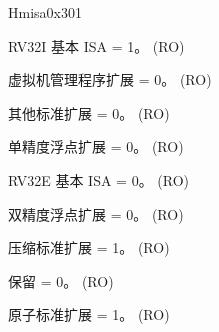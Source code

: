 \begin{register}{H}{misa}{0x301}
\begin{regdesc}
\begin{reglist}
\label{fielddesc:LPMISAI}\item [I] RV32I 基本 ISA = 1。 (RO)
\label{fielddesc:LPMISAH}\item [H] 虚拟机管理程序扩展 = 0。 (RO)
\label{fielddesc:LPMISAG}\item [G] 其他标准扩展 = 0。 (RO)
\label{fielddesc:LPMISAF}\item [F] 单精度浮点扩展 = 0。 (RO)
\label{fielddesc:LPMISAE}\item [E] RV32E 基本 ISA = 0。 (RO)
\label{fielddesc:LPMISAD}\item [D] 双精度浮点扩展 = 0。 (RO)
\label{fielddesc:LPMISAC}\item [C] 压缩标准扩展 = 1。 (RO)
\label{fielddesc:LPMISAB}\item [B] 保留 = 0。 (RO)
\label{fielddesc:LPMISAA}\item [A] 原子标准扩展 = 1。 (RO)
\end{reglist}\end{regdesc}
\end{register}



